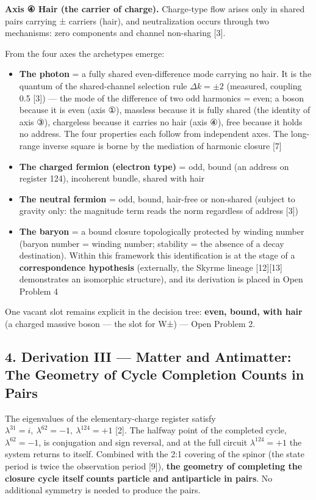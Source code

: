 \documentclass[
  a4paper,
]{article}
\providecommand{\tightlist}{%
  \setlength{\itemsep}{0pt}\setlength{\parskip}{0pt}}
\begin{document}
\textbf{Axis ④ Hair (the carrier of charge).} Charge-type flow arises
only in shared pairs carrying ± carriers (hair), and neutralization
occurs through two mechanisms: zero components and channel non-sharing
{[}3{]}.

From the four axes the archetypes emerge:

\begin{itemize}
\tightlist
\item
  \textbf{The photon} = a fully shared even-difference mode carrying no
  hair. It is the quantum of the shared-channel selection rule
  \(\Delta k=\pm2\) (measured, coupling 0.5 {[}3{]}) --- the mode of the
  difference of two odd harmonics = even; a boson because it is even
  (axis ①), massless because it is fully shared (the identity of axis
  ③), chargeless because it carries no hair (axis ④), free because it
  holds no address. The four properties each follow from independent
  axes. The long-range inverse square is borne by the mediation of
  harmonic closure {[}7{]}
\item
  \textbf{The charged fermion (electron type)} = odd, bound (an address
  on register 124), incoherent bundle, shared with hair
\item
  \textbf{The neutral fermion} = odd, bound, hair-free or non-shared
  (subject to gravity only: the magnitude term reads the norm regardless
  of address {[}3{]})
\item
  \textbf{The baryon} = a bound closure topologically protected by
  winding number (baryon number = winding number; stability = the
  absence of a decay destination). Within this framework this
  identification is at the stage of a \textbf{correspondence hypothesis}
  (externally, the Skyrme lineage {[}12{]}{[}13{]} demonstrates an
  isomorphic structure), and its derivation is placed in Open Problem 4
\end{itemize}

One vacant slot remains explicit in the decision tree: \textbf{even,
bound, with hair} (a charged massive boson --- the slot for W±) --- Open
Problem 2.

\subsection{4. Derivation III --- Matter and Antimatter: The Geometry of
Cycle Completion Counts in
Pairs}\label{derivation-iii-matter-and-antimatter-the-geometry-of-cycle-completion-counts-in-pairs}

The eigenvalues of the elementary-charge register satisfy
\(\lambda^{31}=i,\ \lambda^{62}=-1,\ \lambda^{124}=+1\) {[}2{]}. The
halfway point of the completed cycle, \(\lambda^{62}=-1\), is
conjugation and sign reversal, and at the full circuit
\(\lambda^{124}=+1\) the system returns to itself. Combined with the 2:1
covering of the spinor (the state period is twice the observation period
{[}9{]}), \textbf{the geometry of completing the closure cycle itself
counts particle and antiparticle in pairs}. No additional symmetry is
needed to produce the pairs.
\end{document}
